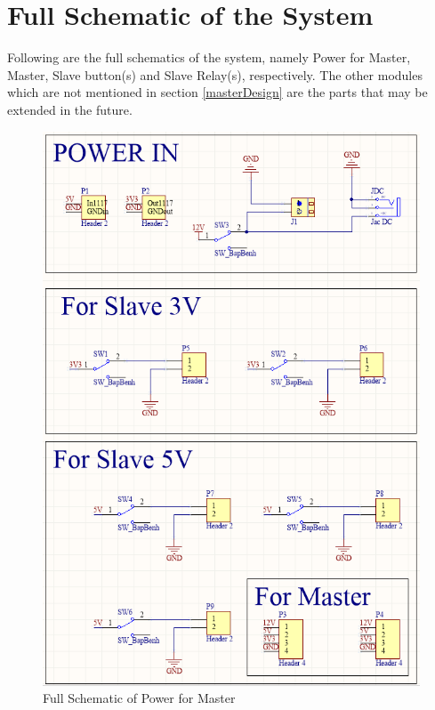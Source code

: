 \section{Full Schematic of the System}
Following are the full schematics of the system, namely Power for Master, Master, Slave button(s) and Slave Relay(s), respectively. The other modules which are not mentioned in section \ref{masterDesign} are the parts that may be extended in the future.
\begin{figure}[!ht]
  \begin{center}
  \includegraphics[scale=0.8]{images/powerMasterFull.PNG}
  \caption{Full Schematic of Power for Master}
  \label{fig:powerMasterFull}
  \end{center}
\end{figure}
